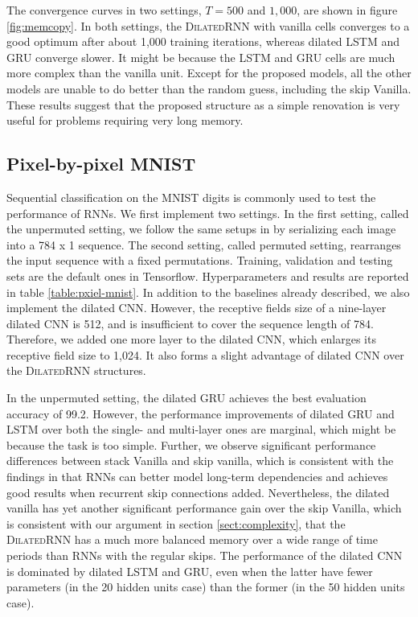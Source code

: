 \documentclass{article}
\newcommand{\algname}{\textsc{DilatedRNN }}
\begin{document}
The convergence curves in two settings, $T = 500$ and $1,000$, are shown in figure \ref{fig:memcopy}.  In both settings, the \algname with vanilla cells converges to a good optimum after about 1,000 training iterations, whereas dilated LSTM and GRU converge slower.  It might be because the LSTM and GRU cells are much more complex than the vanilla unit.  Except for the proposed models, all the other models are unable to do better than the random guess, including the skip Vanilla.  These results suggest that the proposed structure as a simple renovation is very useful for problems requiring very long memory.  

\subsection{Pixel-by-pixel MNIST}
Sequential classification on the MNIST digits \cite{lecun1998gradient} is commonly used to test the performance of RNNs.  We first implement two settings. In the first setting, called the unpermuted setting, we follow the same setups in \cite{arjovsky2016unitary, krueger2016zoneout, le2015simple, wisdom2016full, zhang2016architectural} by serializing each image into a 784 x 1 sequence.  The second setting, called permuted setting, rearranges the input sequence with a fixed permutations.  Training, validation and testing sets are the default ones in Tensorflow.  Hyperparameters and results are reported in table \ref{table:pxiel-mnist}.  In addition to the baselines already described, we also implement the dilated CNN.  However, the receptive fields size of a nine-layer dilated CNN is 512, and is insufficient to cover the sequence length of 784. Therefore, we added one more layer to the dilated CNN, which enlarges its receptive field size to 1,024.  It also forms a slight advantage of dilated CNN over the \algname structures. 

In the unpermuted setting, the dilated GRU achieves the best evaluation accuracy of 99.2.  However, the performance improvements of dilated GRU and LSTM over both the single- and multi-layer ones are marginal, which might be because the task is too simple.   Further, we observe significant performance differences between stack Vanilla and skip vanilla, which is consistent with the findings in \cite{zhang2016architectural} that RNNs can better model long-term dependencies and achieves good results when recurrent skip connections added.  Nevertheless, the dilated vanilla has yet another significant performance gain over the skip Vanilla, which is consistent with our argument in section \ref{sect:complexity}, that the \algname has a much more balanced memory over a wide range of time periods than RNNs with the regular skips. The performance of the dilated CNN is dominated by dilated LSTM and GRU, even when the latter have fewer parameters (in the 20 hidden units case) than the former (in the 50 hidden units case).
\end{document}
